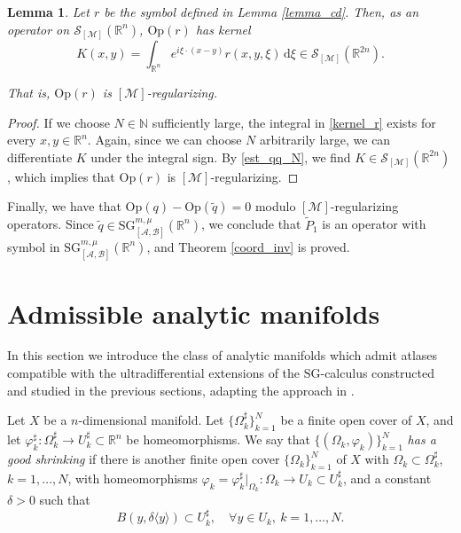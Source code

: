 \documentclass[11pt,reqno]{amsart}
\numberwithin{equation}{section}
\newtheorem{lemma}[theorem]{Lemma}
\newcommand{\caS}{{\mathcal{S}}}
\newcommand{\SG}{{\mathrm{SG}}}
\newcommand{\M}{{\mathcal{M}}} %
\newcommand{\A}{{\mathcal{A}}} %
\newcommand{\B}{{\mathcal{B}}} %
\begin{document}
\begin{lemma}
	Let $r$ be the symbol defined in Lemma \ref{lemma_cd}. Then, as an operator on $\caS_{[\M]}(\mathbb{R}^n)$, $\mathrm{Op}(r)$ has kernel
	\begin{equation}\label{kernel_r}
		K(x,y)=\int_{\mathbb{R}^n} e^{i\xi\cdot (x-y)}r(x,y,\xi)\,\mathrm{d}\xi \in \caS_{[\M]}(\mathbb{R}^{2n}).
	\end{equation}
	
	That is, $\mathrm{Op}(r)$ is $[\M]$-regularizing.
\end{lemma}
%
\begin{proof}
	If we choose $N\in\mathbb{N}$ sufficiently large, the integral in \eqref{kernel_r} exists for every $x,y\in\mathbb{R}^n$. 
	Again, since we can choose $N$ arbitrarily large, we can differentiate $K$ under the integral sign. 
	By \eqref{est_qq_N}, we find $K\in\caS_{[\M]}(\mathbb{R}^{2n})$, which implies that $\mathrm{Op}(r)$ is $[\M]$-regularizing. 
\end{proof}


Finally, we have that $\mathrm{Op}(q)-\mathrm{Op}(\tilde q)=0$ modulo $[\M]$-regularizing operators. Since $\tilde q\in {\SG}_{[\A,\B]}^{m,\mu}(\mathbb{R}^n)$, 
we conclude that $\tilde{P}_1$ is an operator with symbol in ${\SG}_{[\A,\B]}^{m,\mu}(\mathbb{R}^n)$, and Theorem \ref{coord_inv} is proved.




\section{Admissible analytic manifolds}\label{sec:compmfs}

In this section we introduce the class of analytic manifolds which admit atlases compatible with the ultradifferential extensions
of the $\SG$-calculus constructed and studied in the previous sections, adapting the approach in \cite{Schrohe86}. 

Let $X$ be a $n$-dimensional manifold. Let $\{\Omega_k^\sharp\}_{k=1}^N$ be a finite open cover of $X$, and let 
$\varphi_k^\sharp:\Omega_k^\sharp\to U_k^\sharp\subset\mathbb{R}^n$ be homeomorphisms. 
We say that $\{(\Omega_k,\varphi_k)\}_{k=1}^N$ \textit{has a good shrinking} if there is another finite open cover $\{\Omega_k\}_{k=1}^N$ of $X$ 
with $\Omega_k\subset\Omega_k^\sharp$, $k=1,\dots,N$, with homeomorphisms
$\varphi_k=\varphi_k^\sharp|_{\Omega_k}:\Omega_k\to U_k\subset U_k^\sharp$, and a constant $\delta>0$ such that
\[B(y,\delta\langle y\rangle)\subset U_k^\sharp,\quad\forall y\in U_k,\ k=1,\dots,N.\]
\end{document}
